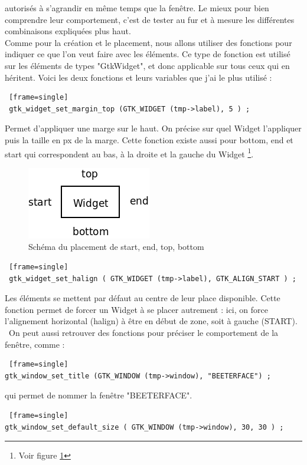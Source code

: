 \documentclass[11pt,french,a4paper]{report}
\begin{document}
autorisés à s'agrandir en même temps que la fenêtre. Le mieux pour bien comprendre leur comportement, c'est de tester au fur
et à mesure les différentes combinaisons expliquées plus haut. \\
Comme pour la création et le placement, nous allons utiliser des fonctions pour indiquer ce que l'on veut faire avec les éléments.
Ce type de fonction est utilisé sur les éléments de types "GtkWidget", et donc applicable sur tous ceux qui en héritent. Voici les
deux fonctions et leurs variables que j'ai le plus utilisé : \\
\begin{lstlisting} [frame=single]
 gtk_widget_set_margin_top (GTK_WIDGET (tmp->label), 5 ) ; 
\end{lstlisting}
Permet d'appliquer une marge sur le haut. On précise sur quel Widget l'appliquer puis la taille en px de la marge.
Cette fonction existe aussi pour bottom, end et start qui correspondent au bas, à la droite et la gauche du Widget
\footnote{Voir figure \ref{sch_pla_top}}.\\
\begin{figure} [!h]
    \centering
        \includegraphics[scale=0.5]{../images/dia/top_bottom_etc.png}
        \caption{Schéma du placement de start, end, top, bottom}
        \label{sch_pla_top}
\end{figure}
\begin{lstlisting} [frame=single]
 gtk_widget_set_halign ( GTK_WIDGET (tmp->label), GTK_ALIGN_START ) ;
\end{lstlisting}
Les éléments se mettent par défaut au centre de leur place disponible. Cette fonction permet 
de forcer un Widget à se placer autrement : ici, on force l'alignement horizontal (halign) à être en début de zone, 
soit à gauche (START). \
On peut aussi retrouver des fonctions pour préciser le comportement de la fenêtre, comme :
\begin{lstlisting} [frame=single]
gtk_window_set_title (GTK_WINDOW (tmp->window), "BEETERFACE") ; 
\end{lstlisting}
qui permet de nommer la fenêtre "BEETERFACE". \\
\begin{lstlisting} [frame=single]
gtk_window_set_default_size ( GTK_WINDOW (tmp->window), 30, 30 ) ; 
\end{lstlisting}
\end{document}
